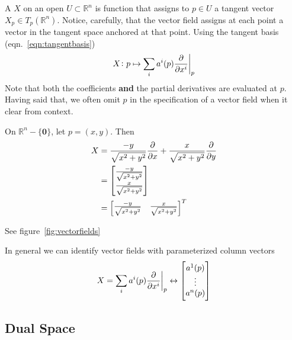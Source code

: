 A  \(X\) on an open \(U \subset \mathbb{R}^n\) is function that assigns to \(p \in U\) a tangent vector \(X_p \in T_p(\mathbb{R}^n)\).
%
Notice, carefully, that the vector field assigns at each point a vector in the tangent space anchored at that point.
%
Using the tangent basis (eqn.~\eqref{eqn:tangentbasis})
%
\begin{equation}
    X\colon p \mapsto \sum_i a^i(p) \evalat[\bigg]{\pdv{}{x^i}}{p}
\end{equation}
%
Note that both the coefficients \textbf{and} the partial derivatives are evaluated at \(p\).
%
Having said that, we often omit \(p\) in the specification of a vector field when it clear from context.
%
\begin{example}{}{}
    On \(\mathbb{R}^n - \{\bm{0}\}\), let \(p = (x,y)\). Then
    \begin{align*}
        X & = \frac{-y}{\sqrt{x^2+y^2}} \pdv{}{x} + \frac{x}{\sqrt{x^2+y^2}} \pdv{}{y} \\
          & = \begin{bmatrix}
            \frac{-y}{\sqrt{x^2+y^2}} \\ \frac{x}{\sqrt{x^2+y^2}}
        \end{bmatrix}                                               \\
          & = \begin{bmatrix}
            \frac{-y}{\sqrt{x^2+y^2}} & \frac{x}{\sqrt{x^2+y^2}}
        \end{bmatrix}^T
    \end{align*}
\end{example}
%
See figure~\ref{fig:vectorfields}

In general we can identify vector fields with parameterized column vectors
%
\begin{equation}
    X = \sum_i a^i(p) \evalat[\bigg]{\pdv{}{x^i}}{p}
    \leftrightarrow
    \begin{bmatrix}
        a^1(p) \\ \vdots \\ a^n(p)
    \end{bmatrix}
\end{equation}

\subsection{Dual Space}

\newcommand{\pdx}[1]{\partial_{x_{#1}}}
\newcommand*{\vwedge}{V^\wedge }
\newcommand*{\vx}{X = \sum a^i \partial_{x_i}}

